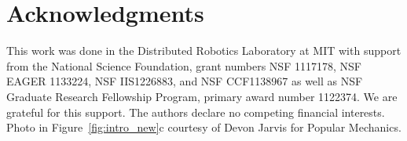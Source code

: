 \section*{Acknowledgments}
\label{sec:Acknowledgments}
This work was done in the Distributed Robotics Laboratory at MIT with support from the National Science Foundation, grant numbers NSF 1117178, NSF EAGER 1133224, NSF IIS1226883, and NSF CCF1138967 as well as NSF Graduate Research Fellowship Program, primary award number 1122374. We are grateful for this support. The authors declare no competing financial interests. Photo in Figure~\ref{fig:intro_new}c courtesy of Devon Jarvis for Popular Mechanics. 